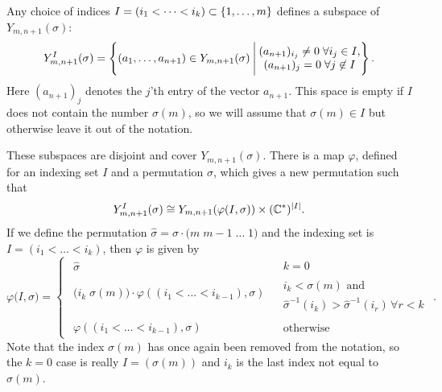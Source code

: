 \begin{lemma}
  \label{lem:permutation}
  Any choice of indices $I= (i_1<\dots<i_k) \subset \left\{ 1,\dots,m \right\}$
  defines a subspace of $Y_{m,n+1}(\sigma)$:
  \[ Y_{m,n+1}^I(\sigma) = \left\{ (a_1,\dots,a_{n+1}) \in
    Y_{m,n+1}(\sigma) \:\Bigg\vert\: 
    \begin{matrix} 
      (a_{n+1})_{i_j} \neq 0\; \forall i_j \in I, \\
      (a_{n+1})_j = 0 \;\forall j \not\in I
    \end{matrix}  \right\}. \]
  Here $(a_{n+1})_j$ denotes the $j$'th entry of the vector $a_{n+1}$.
  This space is empty if $I$ does not contain the number $\sigma(m)$,
  so we will assume that $\sigma(m) \in I$ but otherwise leave it out
  of the notation.
  
  These subspaces are disjoint and cover $Y_{m,n+1}(\sigma)$. There is
  a map $\varphi$,
  defined for an indexing set $I$ and a permutation $\sigma$, which
  gives a new permutation such that
  \[ Y_{m,n+1}^I(\sigma) \cong Y_{m,n+1}(\varphi(I,\sigma)) \times
  (\mathbb{C}^*)^{\left| I \right|}. \]
  If we define the permutation $\widehat \sigma = \sigma \cdot
  \big(m\; m-1\; \dots \; 1\big)$ and the indexing set is ${I = (i_1 <
  \dots < i_k)}$, then $\varphi$ is given by
  \[ \varphi\big(I,\sigma\big) = 
  \begin{cases}
    \begin{matrix} \widehat\sigma \end{matrix} & 
    \begin{array}{l} k = 0 \end{array} \\
    \begin{matrix}
      \big( i_k\; \sigma(m) \big) \cdot \varphi\left( (i_1 < \dots <
        i_{k-1}),\sigma\right) \\
    \end{matrix} &
    \begin{array}{l} i_k < \sigma(m) \text{ and } \\
      \widehat\sigma^{-1}(i_k) > \widehat\sigma^{-1}(i_r) \,
      \forall r < k\end{array}\\
    \begin{matrix}
      \varphi\left( (i_1 < \dots < i_{k-1}),\sigma\right)
    \end{matrix} &
    \begin{array}{l} \text{otherwise} \end{array}
  \end{cases}. \]
  Note that the index $\sigma(m)$ has once again been removed from the
  notation, 
  so the $k = 0$ case is really $I = (\sigma(m))$ and $i_k$
  is the last index not equal to $\sigma(m)$.
\end{lemma} 
